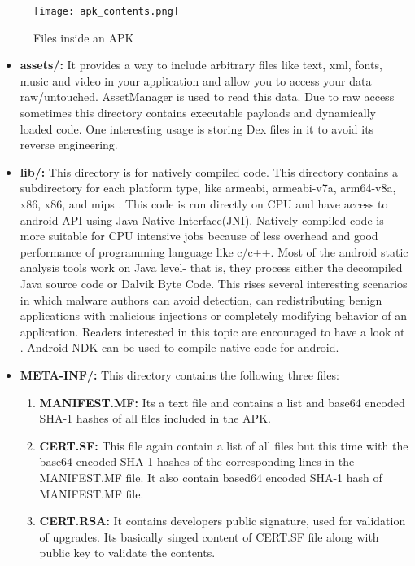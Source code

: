 \documentclass[../main.tex]{subfile}
\begin{document}
		\begin{figure}[h]
			\centering
			\texttt{[image: apk\_contents.png]}
			\caption{Files inside an APK}
		\end{figure}
		
		\begin{itemize}
			\item \textbf{assets/:} It provides a way to include arbitrary files like text, xml, fonts, music and video in your application and allow you to access your data raw/untouched. AssetManager is used to read this data\cite{android_assets}. Due to raw access sometimes this directory contains executable payloads and dynamically loaded code. One interesting usage is storing Dex files in it to avoid its reverse engineering. \cite{lim2016android}
			
			\item \textbf{lib/:} This directory is for natively compiled code. This directory contains a subdirectory for each platform type, like armeabi, armeabi-v7a, arm64-v8a, x86, x86, and mips \cite{APK_structure}. This code is run directly on CPU and have access to android API using Java Native Interface(JNI). Natively compiled code is more suitable for CPU intensive jobs because of less overhead and good performance of programming language like c/c++. Most of the android  static analysis tools work on Java level- that is, they process either the decompiled Java source code or Dalvik Byte Code\cite{afonso2016going}. This rises several interesting scenarios in which malware authors can avoid detection, can redistributing benign applications with malicious injections or completely modifying behavior of an application. Readers interested in this topic are encouraged to have a look at \cite{afonso2016going}. Android NDK can be used to compile native code for android. 
			
			
			\item \textbf{META-INF/:} This directory contains the following three files:
			\begin{enumerate}
				\item \textbf{MANIFEST.MF:} Its a text file and contains a list and base64 encoded SHA-1 hashes of all files included in the APK.
				\item \textbf{CERT.SF:} This file again contain a list of all files but this time with the base64 encoded SHA-1 hashes of the corresponding lines in the MANIFEST.MF file. It also contain based64 encoded SHA-1 hash of MANIFEST.MF file.
				\item \textbf{CERT.RSA:} It contains developers public signature, used for validation of upgrades. Its basically singed content of CERT.SF file along with public key to validate the contents.
			\end{enumerate}
			

\end{itemize}
\end{document}

